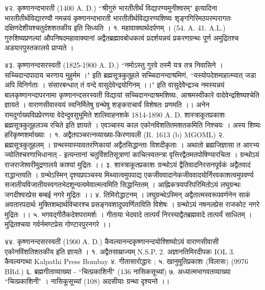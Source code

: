 ४२. कृष्णानन्दभारती (1400 A. D.)
``श्रीगुरुं भारतीतीर्थं विद्यारण्यमुनीश्वरम्" इत्यादिना भारतीतीर्थविद्यारण्यौ नमन्नयं कृष्णानन्दभारती भारतीतीर्थविद्यारण्यशिष्यः शृङ्गगिरिमठपरम्परागतः दक्षिणदेशीयश्चतुर्दशशतकीय इति सिध्यति ।
१. महावाक्यार्थदर्पणम् । (54. A. 41. A.L.)
गुरुशिष्यप्रणल्यां औपनिषदमहावाक्यानां अद्वैतब्रह्मावबोधकत्वं प्रदर्शयन्नयं प्रकरणग्रन्थः पूर्ण अमुद्रितश्च अडयारपुस्तकालये प्राप्यते ।

४३. कृष्णानन्दसरस्वती (1825-1900 A. D.)
``नमोऽस्तु गुरवे तस्मै यत्र तत्र निवासिने । सच्चिदान्दपादाय चरणाय मुहुर्मम ।" इति ब्रह्मसूत्रकुतूहले सच्चिदानन्दाश्रमिणं, ``यस्योपदेशमाहात्म्यात् जडा अपि विनिर्गताः । संसारबन्धात् तं वन्दे वासुदेवेन्द्रयोगिनम् ।।" इति वासुदेवेेन्द्रञ्च नमस्यन्नयं बालकृष्णानन्दापरनामा कृष्णानन्दसरस्वती विद्यायां सच्चिदानन्दाश्रमशिष्यः, आश्रमस्वीकारे वादेवेन्द्रशिष्यश्चेति ज्ञायते । वाराणसीवास्ययं स्वनिर्मितेषु ग्रन्थेषु शङ्कराचार्यं विशेषतः प्रणमति ।।
अनेन रामदुर्गाख्यविप्रप्रेरणया वेदेन्दुवसुभूमिते शालिवाहनशके 1814-1890 A. D. शास्त्राकूतप्रकाशः ब्रह्मसूत्रकुतूहलञ्च रचिते इति ज्ञायते । एवञ्चास्य काल एकोनविशतितमशतकमिति निश्चयः । अस्य शिष्यः हरिकृष्णशर्माख्याः ।
१. अद्वैतपञ्चरत्नव्याख्या-किरणावली (R. 1613 (b) MGOML)
२. ब्रह्मसूत्रकुतूहलम् ।
ग्रन्थस्यास्यावतरणिकायां अद्वैतसिद्धान्ताः विशदीकृताः । अथातो ब्रह्मजिज्ञासा त आरभ्य ज्योतिश्चरणाभिधानात् - इत्यन्तानां चतुर्विशतिसूत्राणां काचित्स्वतन्त्रा वृत्तिरद्वैतमतपोषिण्यारचिता । ग्रन्थोऽयं राजराजेश्वरीमुद्रणालये काश्यां मुद्रितः ।।
३. शास्त्राकूतप्रकाशः 
ग्रन्थोऽयं द्वैतिवादनिरसनपूर्वकं अद्वैतवादं राद्धान्तयति । ग्रन्थेऽस्मिन् दृश्यप्रपञ्चस्य मिथ्यात्वमुपपाद्य एकजीववादानेकजीववादयोर्निरवकाशत्वमुपवर्ण्य सजातीयविजातीयस्वगतभेदशून्यत्वमेवात्मत्वमिति सिद्धान्तितम् । आह्निकत्रयपरिपरिमितोऽयं लघुग्रन्थः जगदीश्वरप्रेस बम्बई नगरे मुद्रितः ।।
४. तिमिरोद्धाटनम् ।
लघुग्रन्थेऽस्मिन् अद्वैतात्मस्वरूपवर्णनेन साकं अवतारपदार्थः मुक्तिशब्दार्थविचारश्च प्रसङ्गवशादुपवर्णिताविति विशेषः । ग्रन्थोऽयं नषनलप्रेस राजकोट नगरे मुद्रितः ।।
५. भगवद्गीतैकदेशपरामर्शः ।
गीताया भेदवादे तात्पर्यं निरस्याद्वैतब्रह्मवादे तात्पर्यं साधितम् । मुद्रितश्चया गर्वर्नमण्टप्रेस गोण्टारपुरनगरे ।।

४४. कृष्णानन्दसरस्वती (1900 A. D.)
कैवल्यानन्दकृष्णानन्दयोश्शिष्योऽयं वाराणसीवासी एकोनविंशतिशतकीय इति ज्ञायते । १. अद्वैतसाम्राज्यम् N.S.P. 2. अज्ञानतिमिरदीपकः IOL 3. कैवल्यगाथा Kalpathi Press Bombay ४. गीतासारोद्धारः ; ५. खानुमूतिप्रकाशः (विलासः) (9976 BRd.) ६. ब्रह्मगीताव्याख्या - ``चित्प्रकाशिनी" (136 नासिकसूच्यां) ७. अध्यात्मभागवतव्याख्या ``चित्प्रकाशिनी" । नासिकूसूच्यां (108) अदसीयाः ग्रन्था दृश्यन्ते ।।

